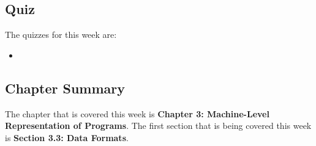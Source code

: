 \subsection{Quiz}

The quizzes for this week are:

\begin{itemize}
    \item {}
\end{itemize}

\subsection{Chapter Summary}

The chapter that is covered this week is \textbf{Chapter 3: Machine-Level Representation of Programs}. The first section that is being covered this week is \textbf{Section 3.3: Data Formats}.

